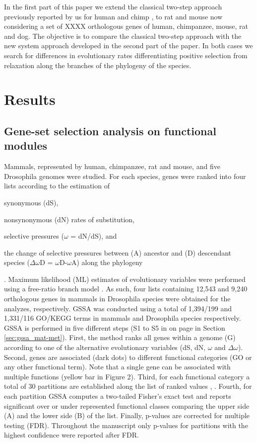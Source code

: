 In the first part of this paper we extend the classical two-step approach previously reported by us for human and chimp \cite{Arbiza2006}, to rat and mouse now considering a set of XXXX orthologous genes of human, chimpanzee, mouse, rat and dog. The objective is to compare the classical two-step approach with the new system approach developed in the second part of the paper. In both cases we search for differences in evolutionary rates differentiating positive selection from relaxation along the branches of the phylogeny of the species.

\section{Results}

\subsection{Gene-set selection analysis on functional modules}

Mammals, represented by human, chimpanzee, rat and mouse, and five Drosophila genomes were studied. For each species, genes were ranked into four lists according to the estimation of \begin{inparaenum}[i\upshape-] \item synonymous (dS), \item nonsynonymous (dN) rates of substitution, \item selective pressures ($\omega$ = dN/dS), and \item the change of selective pressures between (A) ancestor and (D) descendant species ($\Delta\omega$D = $\omega$D-$\omega$A) along the phylogeny \end{inparaenum}. Maximum likelihood (ML) estimates of evolutionary variables were performed using a free-ratio branch model \cite{Yang2007}. As such, four lists containing 12,543 and 9,240 orthologous genes in mammals in Drosophila species were obtained for the analyzes, respectively. GSSA was conducted using a total of 1,394/199 and 1,331/116 GO/KEGG terms in mammals and Drosophila species respectively. GSSA is performed in five different steps (S1 to S5 in  on page \pageref{fig:gssa_met} in Section \ref{sec:gssa_mat-met}). First, the method ranks all genes within a genome (G) according to one of the alternative evolutionary variables (dS, dN, $\omega$ and $\Delta\omega$). Second, genes are associated (dark dots) to different functional categories (GO or any other functional term). Note that a single gene can be associated with multiple functions (yellow bar in Figure 2). Third, for each functional category a total of 30 partitions are established along the list of ranked values \cite{Al-Shahrour2007}, \cite{Al-Shahrour2005a}. Fourth, for each partition GSSA computes a two-tailed Fisher's exact test and reports significant over or under represented functional classes comparing the upper side (A) and the lower side (B) of the list. Finally, p-values are corrected for multiple testing (FDR). Throughout the manuscript only p-values for partitions with the highest confidence were reported after FDR.

